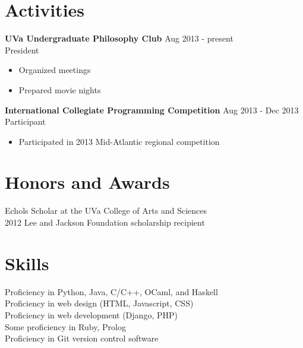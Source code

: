 \documentclass[margin]{res}
\begin{document}
\begin{resume}
 

\section{Activities} 


  {\bf UVa Undergraduate Philosophy Club} \hfill Aug 2013 - present \\ President

  \begin{itemize} \itemsep -2pt
    
      \item Organized meetings
    
      \item Prepared movie nights
    
  \end{itemize}

  {\bf International Collegiate Programming Competition} \hfill Aug 2013 - Dec 2013 \\ Participant

  \begin{itemize} \itemsep -2pt
    
      \item Participated in 2013 Mid-Atlantic regional competition
    
  \end{itemize}



\section{Honors and Awards}
 Echols Scholar at the UVa College of Arts and Sciences \\
 2012 Lee and Jackson Foundation scholarship recipient \\



\section{Skills}
 Proficiency in Python, Java, C/C++, OCaml, and Haskell \\
 Proficiency in web design (HTML, Javascript, CSS) \\
 Proficiency in web development (Django, PHP) \\
 Some proficiency in Ruby, Prolog \\
 Proficiency in Git version control software \\



\end{resume} 
\end{document}
